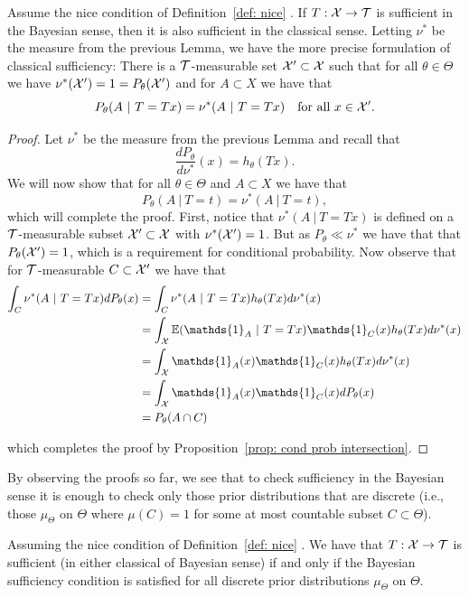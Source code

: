 \documentclass[twoside, a4paper, 10pt]{amsart}
\begin{document}
\begin{thm}\label{thm: bayesian implies classical sufficient} Assume the nice condition of Definition~\ref{def: nice} . If $T:\mathcal{X} \to \mathcal{T}$ is sufficient in the Bayesian sense, then it is also sufficient in the classical sense. Letting $\nu^*$ be the measure from the previous Lemma, we have the more precise formulation of classical sufficiency: 
There is a $\mathcal{T}$-measurable set $\mathcal{X}' \subset \mathcal{X}$ such that for all $\theta \in \Theta$ we have $\nu^*(\mathcal{X}') = 1 = P_{\theta}(\mathcal{X}')$ and for $A \subset X$ we have that $$P_{\theta}(A~|~T=Tx) = \nu^*(A~|~T=Tx) \quad\text{for all } x \in \mathcal{X}'.$$

\end{thm}

\begin{proof} Let $\nu^*$ be the measure from the previous Lemma and recall that $$\frac{dP_{\theta}}{d\nu^*}(x) = h_{\theta}(Tx).$$ We will now show that for all $\theta \in \Theta$ and $A \subset X$ we have that $$P_{\theta}(A~|~T=t) = \nu^*(A~|~T=t),$$ which will complete the proof. First, notice that $\nu^*(A~|~T=Tx)$ is defined on a $\mathcal{T}$-measurable subset $\mathcal{X}' \subset \mathcal{X}$ with $\nu^*(\mathcal{X}') = 1$. But as $P_{\theta} \ll \nu^*$ we have that that $P_{\theta}(\mathcal{X}')=1$, which is a requirement for conditional probability. Now observe that for $\mathcal{T}$-measurable $C \subset \mathcal{X}'$ we have that
\begin{align*} \int_{C} \nu^*(A~|~T=Tx)dP_{\theta}(x) 
&= \int_{C} \nu^* (A~|~T=Tx) h_{\theta}(Tx) d\nu^*(x) \\
&= \int_{\cX} \bE(\mathds{1}_A ~|~ T=Tx) \mathds{1}_{C}(x)h_{\theta}(Tx) d\nu^*(x) \\
&= \int_{\cX} \mathds{1}_A (x) \mathds{1}_{C}(x)h_{\theta}(Tx) d\nu^*(x)  \\
&= \int_{\cX}  \mathds{1}_A (x) \mathds{1}_{C}(x) dP_{\theta}(x)  \\
&= P_{\theta}(A \cap C)\end{align*}

which completes the proof by Proposition~\ref{prop: cond prob intersection}. \end{proof}

By observing the proofs so far, we see that to check sufficiency in the Bayesian sense it is enough to check only those prior distributions that are discrete (i.e., those $\mu_{\Theta}$ on $\Theta$ where $\mu(C) = 1$ for some at most countable subset $C \subset \Theta$).

\begin{corol} \label{corol: sufficiency enough for discrete prior} Assuming the nice condition of Definition~\ref{def: nice} . We have that $T:\mathcal{X} \to \mathcal{T}$ is sufficient (in either classical of Bayesian sense) if and only if the Bayesian sufficiency condition is satisfied for all discrete prior distributions $\mu_{\Theta}$ on $\Theta$.

\end{corol}
\end{document}
